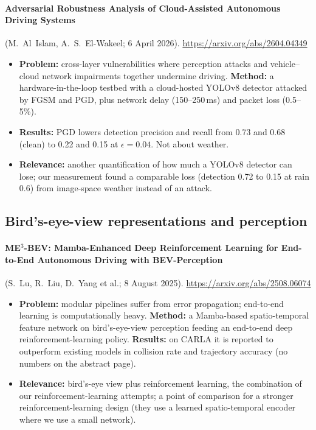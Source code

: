 \paragraph{Adversarial Robustness Analysis of Cloud-Assisted Autonomous Driving Systems} (M.~Al~Islam, A.~S.~El-Wakeel; 6 April 2026). \url{https://arxiv.org/abs/2604.04349}
\begin{itemize}
\item \textbf{Problem:} cross-layer vulnerabilities where perception attacks and vehicle--cloud network impairments together undermine driving. \textbf{Method:} a hardware-in-the-loop testbed with a cloud-hosted YOLOv8 detector attacked by FGSM and PGD, plus network delay (150--250\,ms) and packet loss (0.5--5\%).
\item \textbf{Results:} PGD lowers detection precision and recall from 0.73 and 0.68 (clean) to 0.22 and 0.15 at $\epsilon=0.04$. Not about weather.
\item \textbf{Relevance:} another quantification of how much a YOLOv8 detector can lose; our measurement found a comparable loss (detection 0.72 to 0.15 at rain 0.6) from image-space weather instead of an attack.
\end{itemize}

\subsection{Bird's-eye-view representations and perception}

\paragraph{ME$^3$-BEV: Mamba-Enhanced Deep Reinforcement Learning for End-to-End Autonomous Driving with BEV-Perception} (S.~Lu, R.~Liu, D.~Yang et al.; 8 August 2025). \url{https://arxiv.org/abs/2508.06074}
\begin{itemize}
\item \textbf{Problem:} modular pipelines suffer from error propagation; end-to-end learning is computationally heavy. \textbf{Method:} a Mamba-based spatio-temporal feature network on bird's-eye-view perception feeding an end-to-end deep reinforcement-learning policy. \textbf{Results:} on CARLA it is reported to outperform existing models in collision rate and trajectory accuracy (no numbers on the abstract page).
\item \textbf{Relevance:} bird's-eye view plus reinforcement learning, the combination of our reinforcement-learning attempts; a point of comparison for a stronger reinforcement-learning design (they use a learned spatio-temporal encoder where we use a small network).
\end{itemize}

